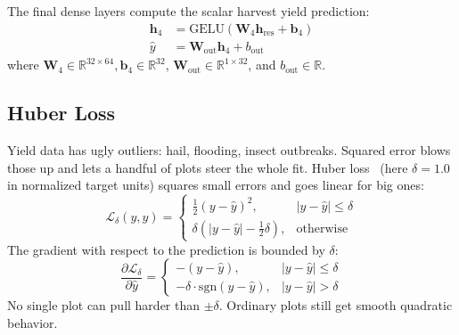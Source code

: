 \documentclass[conference,10pt,letterpaper]{IEEEtran}
\begin{document}
The final dense layers compute the scalar harvest yield prediction:
\begin{align}
\mathbf{h}_4 &= \text{GELU}(\mathbf{W}_4 \mathbf{h}_{\text{res}} + \mathbf{b}_4) \\
\hat{y} &= \mathbf{W}_{\text{out}} \mathbf{h}_4 + b_{\text{out}}
\end{align}
where $\mathbf{W}_4 \in \mathbb{R}^{32 \times 64}, \mathbf{b}_4 \in \mathbb{R}^{32}$, $\mathbf{W}_{\text{out}} \in \mathbb{R}^{1 \times 32}$, and $b_{\text{out}} \in \mathbb{R}$.

\subsection{Huber Loss}
Yield data has ugly outliers: hail, flooding, insect outbreaks. Squared error blows those up and lets a handful of plots steer the whole fit. Huber loss~\cite{huber1964robust} (here $\delta = 1.0$ in normalized target units) squares small errors and goes linear for big ones:
\begin{equation}
\mathcal{L}_{\delta}(y, \hat{y}) =
\begin{cases}
\tfrac{1}{2}(y - \hat{y})^2, & |y - \hat{y}| \le \delta \\[3pt]
\delta \left(|y - \hat{y}| - \tfrac{1}{2}\delta\right), & \text{otherwise}
\end{cases}
\end{equation}
The gradient with respect to the prediction is bounded by $\delta$:
\begin{equation}
\frac{\partial \mathcal{L}_\delta}{\partial \hat{y}} =
\begin{cases}
-(y - \hat{y}), & |y - \hat{y}| \le \delta \\[3pt]
-\delta \cdot \text{sgn}(y - \hat{y}), & |y - \hat{y}| > \delta
\end{cases}
\end{equation}
No single plot can pull harder than $\pm\delta$. Ordinary plots still get smooth quadratic behavior.
\end{document}
